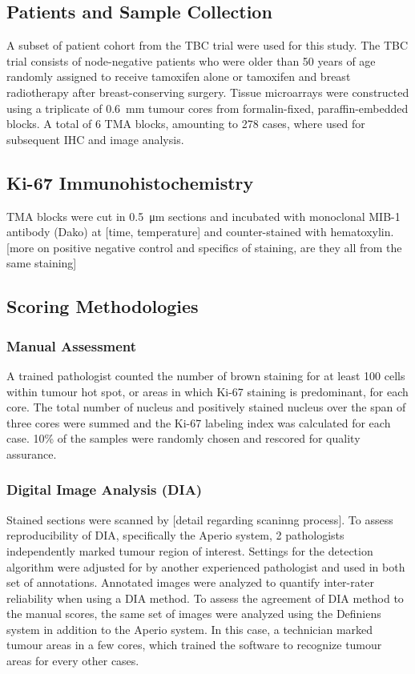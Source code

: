 \documentclass[final,5p,times,twocolumn]{elsarticle}
\begin{document}
\subsection*{Patients and Sample Collection}
A subset of patient cohort from the TBC trial were used for this study. The TBC trial consists of node-negative patients who were older than 50 years of age randomly assigned to receive tamoxifen alone or tamoxifen and breast radiotherapy after breast-conserving surgery. \cite{Fyles2009} Tissue microarrays were constructed using a triplicate of \SI{0.6}{\milli\metre} tumour cores from formalin-fixed, paraffin-embedded blocks. A total of 6 TMA blocks, amounting to 278 cases, where used for subsequent IHC and image analysis.

\subsection*{Ki-67 Immunohistochemistry}

TMA blocks were cut in \SI{0.5}{\micro\metre} sections and incubated with monoclonal MIB-1 antibody (Dako) at [time, temperature] and counter-stained with hematoxylin. [more on positive negative control and specifics of staining, are they all from the same staining]

\subsection*{Scoring Methodologies}

\subsubsection*{Manual Assessment}
A trained pathologist counted the number of brown staining for at least 100 cells within tumour hot spot, or areas in which Ki-67 staining is predominant, for each core. The total number of nucleus and positively stained nucleus over the span of three cores were summed and the Ki-67 labeling index was calculated for each case. 10\% of the samples were randomly chosen and rescored for quality assurance.

\subsubsection*{Digital Image Analysis (DIA)}
Stained sections were scanned by [detail regarding scaninng process]. To assess reproducibility of DIA, specifically the Aperio system, 2 pathologists independently marked tumour region of interest. Settings for the detection algorithm were adjusted for by another experienced pathologist and used in both set of annotations. Annotated images were analyzed to quantify inter-rater reliability when using a DIA method. To assess the agreement of DIA method to the manual scores, the same set of images were analyzed using the Definiens system in addition to the Aperio system. In this case, a technician marked tumour areas in a few cores, which trained the software to recognize tumour areas for every other cases.
\end{document}
